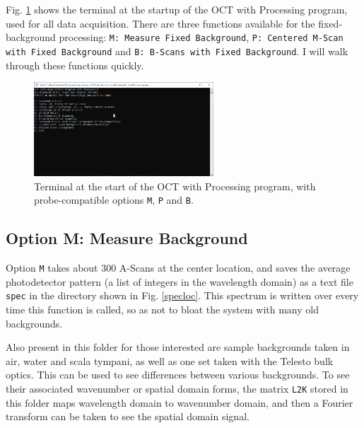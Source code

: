 \documentclass{article}
\begin{document}
\par{Fig. \ref{termstart} shows the terminal at the startup of the OCT with Processing program, used for all data acquisition. There are three functions available for the fixed-background processing: \texttt{M: Measure Fixed Background}, \texttt{P: Centered M-Scan with Fixed Background} and \texttt{B: B-Scans with Fixed Background}. I will walk through these functions quickly.}

\begin{figure}[!h]\label{termstart}
	\centering
	\includegraphics[width=0.6\textwidth]{Data for Probe Writeup/Terminal at Startup.png}
	\caption{Terminal at the start of the OCT with Processing program, with probe-compatible options \texttt{M}, \texttt{P} and \texttt{B}.}
\end{figure}

\subsection{Option M: Measure Background}

\par{Option \texttt{M} takes about 300 A-Scans at the center location, and saves the average photodetector pattern (a list of integers in the wavelength domain) as a text file \texttt{spec} in the directory shown in Fig. \ref{specloc}. This spectrum is written over every time this function is called, so as not to bloat the system with many old backgrounds.}

\par{Also present in this folder for those interested are sample backgrounds taken in air, water and scala tympani, as well as one set taken with the Telesto bulk optics. This can be used to see differences between various backgrounds. To see their associated wavenumber or spatial domain forms, the matrix \texttt{L2K} stored in this folder maps wavelength domain to wavenumber domain, and then a Fourier transform can be taken to see the spatial domain signal.}
\end{document}

